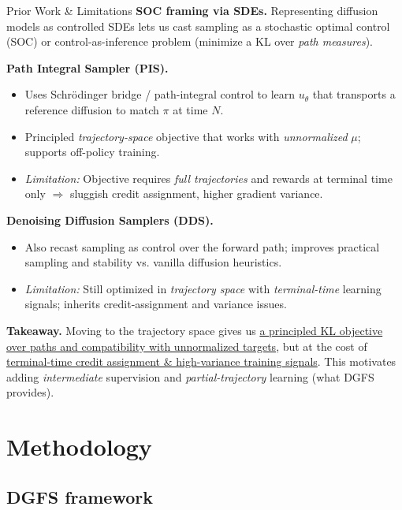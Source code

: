 \documentclass[aspectratio=169,xcolor=dvipsnames]{beamer}
\begin{document}
\begin{frame}[t]{Prior Work \& Limitations}
\textbf{SOC framing via SDEs.} Representing diffusion models as controlled SDEs lets us cast sampling as a stochastic optimal control (SOC) or control-as-inference problem (minimize a KL over \emph{path measures}).

\medskip
\textbf{Path Integral Sampler (PIS).}
\begin{itemize}
  \item Uses Schr\"odinger bridge / path-integral control to learn $u_\theta$ that transports a reference diffusion to match $\pi$ at time $N$.
  \item Principled \emph{trajectory-space} objective that works with \emph{unnormalized} $\mu$; supports off-policy training.
  \item \textit{Limitation:} Objective requires \emph{full trajectories} and rewards at terminal time only \(\Rightarrow\) sluggish credit assignment, higher gradient variance.
\end{itemize}

\textbf{Denoising Diffusion Samplers (DDS).}
\begin{itemize}
  \item Also recast sampling as control over the forward path; improves practical sampling and stability vs. vanilla diffusion heuristics.
  \item \textit{Limitation:} Still optimized in \emph{trajectory space} with \emph{terminal-time} learning signals; inherits credit-assignment and variance issues.
\end{itemize}

\medskip
\textbf{Takeaway.} Moving to the trajectory space gives us \underline{a principled KL objective over paths and compatibility with unnormalized targets}, but at the cost of \underline{terminal-time credit assignment \& high-variance training signals}. This motivates adding \emph{intermediate} supervision and \emph{partial-trajectory} learning (what DGFS provides).
\end{frame}


\section{Methodology}

\subsection{DGFS framework}
\end{document}
